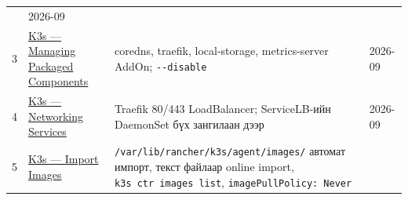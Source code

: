 \begin{longtable}[]{@{}llll@{}}
\begin{minipage}[t]{0.22\columnwidth}
\end{minipage} & \begin{minipage}[t]{0.22\columnwidth}\raggedright
2026-09\strut
\end{minipage}\tabularnewline
\begin{minipage}[t]{0.22\columnwidth}\raggedright
3\strut
\end{minipage} & \begin{minipage}[t]{0.22\columnwidth}\raggedright
\href{https://docs.k3s.io/installation/packaged-components}{K3s --- Managing Packaged Components}\strut
\end{minipage} & \begin{minipage}[t]{0.22\columnwidth}\raggedright
coredns, traefik, local-storage, metrics-server AddOn; \texttt{-\/-disable}\strut
\end{minipage} & \begin{minipage}[t]{0.22\columnwidth}\raggedright
2026-09\strut
\end{minipage}\tabularnewline
\begin{minipage}[t]{0.22\columnwidth}\raggedright
4\strut
\end{minipage} & \begin{minipage}[t]{0.22\columnwidth}\raggedright
\href{https://docs.k3s.io/networking/networking-services}{K3s --- Networking Services}\strut
\end{minipage} & \begin{minipage}[t]{0.22\columnwidth}\raggedright
Traefik 80/443 LoadBalancer; ServiceLB-ийн DaemonSet бүх зангилаан дээр\strut
\end{minipage} & \begin{minipage}[t]{0.22\columnwidth}\raggedright
2026-09\strut
\end{minipage}\tabularnewline
\begin{minipage}[t]{0.22\columnwidth}\raggedright
5\strut
\end{minipage} & \begin{minipage}[t]{0.22\columnwidth}\raggedright
\href{https://docs.k3s.io/add-ons/import-images}{K3s --- Import Images}\strut
\end{minipage} & \begin{minipage}[t]{0.22\columnwidth}\raggedright
\texttt{/\allowbreak{}var/\allowbreak{}lib/\allowbreak{}rancher/\allowbreak{}k3s/\allowbreak{}agent/\allowbreak{}images/\allowbreak{}} автомат импорт, текст файлаар online import, \texttt{k3s\ ctr\ images\ list}, \texttt{imagePullPolicy:\allowbreak{}\ Never}\strut
\end{minipage} & \begin{minipage}[t]{0.22\columnwidth}\raggedright

\end{minipage}
\end{longtable}
